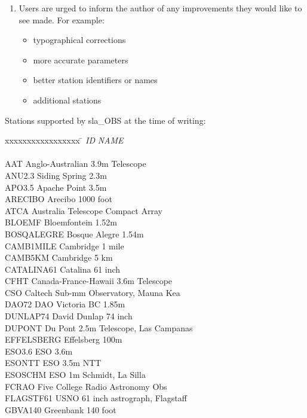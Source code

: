 \documentclass[11pt,twoside]{article}
\begin{document}
{\begin{enumerate}
  \item Users are urged to inform the author of any improvements
        they would like to see made.  For example:
        \begin{itemize}
         \item typographical corrections
         \item more accurate parameters
         \item better station identifiers or names
         \item additional stations
        \end{itemize}
 \end{enumerate}
Stations supported by sla\_OBS at the time of writing:
\begin{tabbing}
xxxxxxxxxxxxxxxxx \= \kill
{\it ID} \> {\it NAME} \\ \\
AAT \> Anglo-Australian 3.9m Telescope \\
ANU2.3 \> Siding Spring 2.3m \\
APO3.5 \> Apache Point 3.5m \\
ARECIBO \> Arecibo 1000 foot \\
ATCA \> Australia Telescope Compact Array \\
BLOEMF \> Bloemfontein 1.52m \\
BOSQALEGRE \> Bosque Alegre 1.54m \\
CAMB1MILE \> Cambridge 1 mile \\
CAMB5KM \> Cambridge 5 km \\
CATALINA61 \> Catalina 61 inch \\
CFHT \> Canada-France-Hawaii 3.6m Telescope \\
CSO \> Caltech Sub-mm Observatory, Mauna Kea \\
DAO72 \> DAO Victoria BC 1.85m \\
DUNLAP74 \> David Dunlap 74 inch \\
DUPONT \> Du Pont 2.5m Telescope, Las Campanas \\
EFFELSBERG \> Effelsberg 100m \\
ESO3.6 \> ESO 3.6m \\
ESONTT \> ESO 3.5m NTT \\
ESOSCHM \> ESO 1m Schmidt, La Silla \\
FCRAO \> Five College Radio Astronomy Obs \\
FLAGSTF61 \> USNO 61 inch astrograph, Flagstaff \\
GBVA140 \> Greenbank 140 foot \\

\end{tabbing}}
\end{document}
